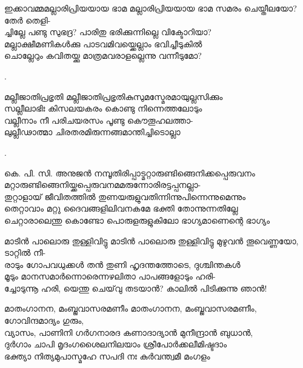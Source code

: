 \begin{enumerate}



\begin{slokam}{\VSv}{ഇക്കാവമ്മ}{മല്ലാരിപ്രിയയായ ഭാമ}
മല്ലാരിപ്രിയയായ ഭാമ സമരം ചെയ്തീലയോ? തേർ തെളി-\\
ച്ചില്ലേ പണ്ടു സുഭദ്ര? പാരിതു ഭരിക്കുന്നില്ലെ വിക്ടോറിയാ?\\
മല്ലാക്ഷീമണികള്‍ക്കു പാടവമിവയ്ക്കെല്ലാം ഭവിച്ചീടുകിൽ\\
ചൊല്ലേറും കവിതയ്ക്കു മാത്രമവരാളല്ലെന്നു വന്നീടുമോ?
\end{slokam}


.


\begin{slokam}{\VMk}{\KV}{മല്ലീജാതിപ്രഭൃതി}
മല്ലീജാതിപ്രഭൃതികുസുമസ്മേരമായുല്ലസിക്കും\\
സല്ലീലാഭിഃ ‍കിസലയകരം കൊണ്ടു നിന്നെത്തലോടും\\
വല്ലീനാം നീ പരിചയരസം പൂണ്ടു കൌതൂഹലത്താ-\\
ലുല്ലീഢാത്മാ ചിരതരമിരുന്നങ്ങമാന്തിച്ചിടൊല്ലാ
\end{slokam}


.



\begin{slokam}{\VSr}{കെ. പി. സി. അനുജൻ നമ്പൂതിരിപ്പാട്}{മറ്റാരുണ്ടിങ്ങെനിക്കപ്പെരുവനം}
മറ്റാരുണ്ടിങ്ങെനിയ്ക്കപ്പെരുവനമമരുന്നോരിരട്ടപ്പനല്ലാ-\\
തുറ്റാളായ് ജീവിതത്തിൽ തുണയരുളുവതിന്നിന്നുപിന്നെന്നുമെന്നും\\
തെറ്റാവാം മറ്റു ദൈവങ്ങളിലിവനകമേ ഭക്തി തോന്നുന്നതില്ലേ\\
ചെറ്റാരാലെന്തു കൊണ്ടോ പൊരുളരുളുകിലോ ഭാഗ്യമാണെന്റെ ഭാഗ്യം
\end{slokam}


\begin{slokam}{\VSv}{\UN}{മാടിൻ പാലൊരു തുള്ളിവിട്ടു}
 മാടിൻ പാലൊരു തുള്ളിവിട്ടു മുഴുവൻ തൂവെണ്ണയോ, ടാറ്റിൽ നീ-\\
രാടും ഗോപവധുക്കള്‍ തൻ തുണി ഹൃദന്തത്തോടെ, ദുശ്ചിന്തകള്‍\\
മൂടും മാനസമാർന്നൊരെന്നഴലിതാ പാപങ്ങളോടും ഹരി-\\
ച്ചോടുന്നൂ ഹരി, യെന്തു ചെയ്‌വു തടയാൻ? കാലിൽ പിടിക്കുന്നു ഞാൻ!
\end{slokam}



\begin{slokam}{\VSv}{\KT}{മാതംഗാനന, മംബ്ജവാസരമണീം}
മാതംഗാനന, മംബ്ജവാസരമണീം, ഗോവിന്ദമാദ്യം ഗുരും,\\
വ്യാസം, പാണിനി ഗർഗനാരദ കണാദാദ്യാൻ മുനീന്ദ്രാൻ ബുധാൻ,\\
ദുർഗാം ചാപി മൃദംഗശൈലനിലയാം ശ്രീപോർക്കലീമിഷ്ടദാം\\
ഭക്ത്യാ നിത്യമുപാസ്മഹേ സപദി നഃ കുർവന്ത്വമീ മംഗളം
\end{slokam}


\end{enumerate}

